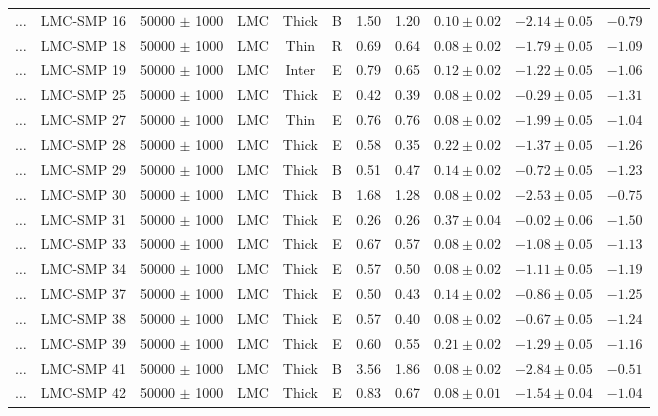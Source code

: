 \documentclass[useAMS]{mn2e}
\begin{document}
\begin{center}
{\begin{longtable}{llccccccccc}
$\ldots$	&	LMC-SMP 16	&	50000 $\pm$ 1000	&	LMC	&	Thick	&	B	&	1.50	&	1.20	&	$0.10 \pm  0.02$	&	$-2.14 \pm 0.05$	&	$-0.79$	\\
$\ldots$	&	LMC-SMP 18	&	50000 $\pm$ 1000	&	LMC	&	Thin	&	R	&	0.69	&	0.64	&	$0.08 \pm  0.02$	&	$-1.79 \pm 0.05$	&	$-1.09$	\\
$\ldots$	&	LMC-SMP 19	&	50000 $\pm$ 1000	&	LMC	&	Inter	&	E	&	0.79	&	0.65	&	$0.12 \pm  0.02$	&	$-1.22 \pm 0.05$	&	$-1.06$	\\
$\ldots$	&	LMC-SMP 25	&	50000 $\pm$ 1000	&	LMC	&	Thick	&	E	&	0.42	&	0.39	&	$0.08 \pm  0.02$	&	$-0.29 \pm 0.05$	&	$-1.31$	\\
$\ldots$	&	LMC-SMP 27	&	50000 $\pm$ 1000	&	LMC	&	Thin	&	E	&	0.76	&	0.76	&	$0.08 \pm  0.02$	&	$-1.99 \pm 0.05$	&	$-1.04$	\\
$\ldots$	&	LMC-SMP 28	&	50000 $\pm$ 1000	&	LMC	&	Thick	&	E	&	0.58	&	0.35	&	$0.22 \pm  0.02$	&	$-1.37 \pm 0.05$	&	$-1.26$	\\
$\ldots$	&	LMC-SMP 29	&	50000 $\pm$ 1000	&	LMC	&	Thick	&	B	&	0.51	&	0.47	&	$0.14 \pm  0.02$	&	$-0.72 \pm 0.05$	&	$-1.23$	\\
$\ldots$	&	LMC-SMP 30	&	50000 $\pm$ 1000	&	LMC	&	Thick	&	B	&	1.68	&	1.28	&	$0.08 \pm  0.02$	&	$-2.53 \pm 0.05$	&	$-0.75$	\\
$\ldots$	&	LMC-SMP 31	&	50000 $\pm$ 1000	&	LMC	&	Thick	&	E	&	0.26	&	0.26	&	$0.37 \pm  0.04$	&	$-0.02 \pm 0.06$	&	$-1.50$	\\
$\ldots$	&	LMC-SMP 33	&	50000 $\pm$ 1000	&	LMC	&	Thick	&	E	&	0.67	&	0.57	&	$0.08 \pm  0.02$	&	$-1.08 \pm 0.05$	&	$-1.13$	\\
$\ldots$	&	LMC-SMP 34	&	50000 $\pm$ 1000	&	LMC	&	Thick	&	E	&	0.57	&	0.50	&	$0.08 \pm  0.02$	&	$-1.11 \pm 0.05$	&	$-1.19$	\\
$\ldots$	&	LMC-SMP 37	&	50000 $\pm$ 1000	&	LMC	&	Thick	&	E	&	0.50	&	0.43	&	$0.14 \pm  0.02$	&	$-0.86 \pm 0.05$	&	$-1.25$	\\
$\ldots$	&	LMC-SMP 38	&	50000 $\pm$ 1000	&	LMC	&	Thick	&	E	&	0.57	&	0.40	&	$0.08 \pm  0.02$	&	$-0.67 \pm 0.05$	&	$-1.24$	\\
$\ldots$	&	LMC-SMP 39	&	50000 $\pm$ 1000	&	LMC	&	Thick	&	E	&	0.60	&	0.55	&	$0.21 \pm  0.02$	&	$-1.29 \pm 0.05$	&	$-1.16$	\\
$\ldots$	&	LMC-SMP 41	&	50000 $\pm$ 1000	&	LMC	&	Thick	&	B	&	3.56	&	1.86	&	$0.08 \pm  0.02$	&	$-2.84 \pm 0.05$	&	$-0.51$	\\
$\ldots$	&	LMC-SMP 42	&	50000 $\pm$ 1000	&	LMC	&	Thick	&	E	&	0.83	&	0.67	&	$0.08 \pm  0.01$	&	$-1.54 \pm 0.04$	&	$-1.04$	\\

\end{longtable}}
\end{center}
\end{document}
